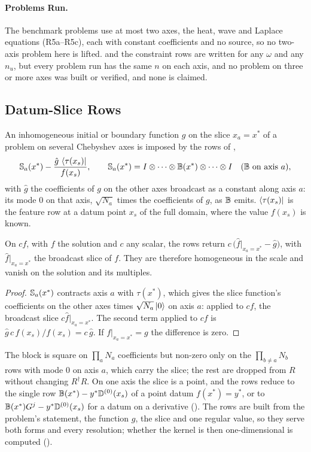 \paragraph{Problems Run.} The benchmark problems use at most two axes, the heat, wave and Laplace equations (R5a--R5c), each with constant coefficients and no source, so no two-axis problem here is lifted.  and the constraint rows are written for any $\omega$ and any $n_u$, but every problem run has the same $n$ on each axis, and no problem on three or more axes was built or verified, and none is claimed.

\subsection{Datum-Slice Rows}
\label{app:datum-slice}

An inhomogeneous initial or boundary function $g$ on the slice $x_a=x^*$ of a problem on several Chebyshev axes is imposed by the rows of ,
\begin{equation*}
    \mathbb{S}_a(x^*)-\frac{\hat g\,\bra{\tau(x_s)}}{f(x_s)}, \qquad \mathbb{S}_a(x^*)=I\otimes\dots\otimes\mathbb{B}(x^*)\otimes\dots\otimes I\quad(\mathbb{B} \text{ on axis } a),
\end{equation*}
with $\hat g$ the coefficients of $g$ on the other axes broadcast as a constant along axis $a$: its mode $0$ on that axis, $\sqrt{N_a}$ times the coefficients of $g$, as $\mathbb{B}$ emits. $\bra{\tau(x_s)}$ is the feature row at a datum point $x_s$ of the full domain, where the value $f(x_s)$ is known.

\begin{proposition}
\label{prop:datum-slice}
On $cf$, with $f$ the solution and $c$ any scalar, the rows return $c\,\bigl(\hat f|_{x_a=x^*}-\hat g\bigr)$, with $\hat f|_{x_a=x^*}$ the broadcast slice of $f$. They are therefore homogeneous in the scale and vanish on the solution and its multiples.
\end{proposition}
\begin{proof}
$\mathbb{S}_a(x^*)$ contracts axis $a$ with $\tau(x^*)$, which gives the slice function's coefficients on the other axes times $\sqrt{N_a}\ket0$ on axis $a$: applied to $cf$, the broadcast slice $c\hat f|_{x_a=x^*}$. The second term applied to $cf$ is $\hat g\,c\,f(x_s)/f(x_s)=c\,\hat g$. If $f|_{x_a=x^*}=g$ the difference is zero.
\end{proof}

The block is square on $\prod_aN_a$ coefficients but non-zero only on the $\prod_{b\ne a}N_b$ rows with mode $0$ on axis $a$, which carry the slice; the rest are dropped from $R$ without changing $R^\dagger R$. On one axis the slice is a point, and the rows reduce to the single row $\mathbb{B}(x^*)-y^*\mathbb{D}^{(0)}(x_s)$ of a point datum $f(x^*)=y^*$, or to $\mathbb{B}(x^*)G^j-y^*\mathbb{D}^{(0)}(x_s)$ for a datum on a derivative (). The rows are built from the problem's statement, the function $g$, the slice and one regular value, so they serve both forms and every resolution; whether the kernel is then one-dimensional is computed ().

